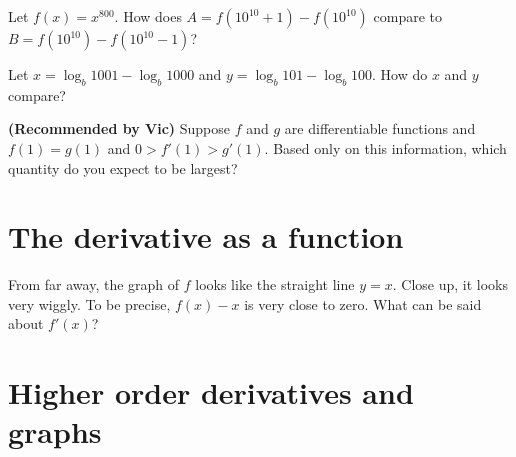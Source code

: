 \documentclass{ximera}
\newcommand{\recommendation}[1]{\textbf{(Recommended by #1)}}
\begin{document}
\begin{problem}
  Let $f(x) = x^{800}$.  How does $A = f(10^{10} + 1) - f(10^{10})$ compare to $B = f(10^{10}) - f(10^{10} - 1)$?
  \begin{multipleChoice}
  \end{multipleChoice}
\end{problem}

\begin{problem}
  Let $x = \log_b 1001 - \log_b 1000$ and $y = \log_b 101 - \log_b 100$.  How do $x$ and $y$ compare?
  \begin{multipleChoice}
  \end{multipleChoice}
\end{problem}

\begin{problem}
\recommendation{Vic}
  Suppose $f$ and $g$ are differentiable functions and $f(1) = g(1)$ and 
  $0 > f'(1) > g'(1)$.  Based only on this information, which quantity
  do you expect to be largest?
  \begin{multipleChoice}
  \end{multipleChoice}
\end{problem}

\clearpage

\section{The derivative as a function}

\begin{problem}
  From far away, the graph of $f$ looks like the straight line
  $y = x$.  Close up, it looks very wiggly.  To be precise, $f(x) - x$
  is very close to zero.  What can be said about $f'(x)$?
  \begin{multipleChoice}
  \end{multipleChoice}
\end{problem}

\clearpage

\section{Higher order derivatives and graphs}
\end{document}
